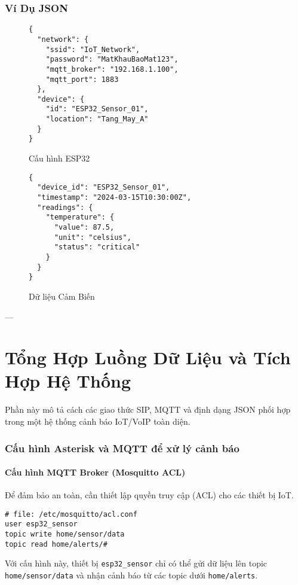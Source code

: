 \subsubsection{Ví Dụ JSON}
\label{subsubsec:json_examples}

\begin{figure}[H]
\centering
\begin{verbatim}
{
  "network": {
    "ssid": "IoT_Network",
    "password": "MatKhauBaoMat123",
    "mqtt_broker": "192.168.1.100",
    "mqtt_port": 1883
  },
  "device": {
    "id": "ESP32_Sensor_01",
    "location": "Tang_May_A"
  }
}
\end{verbatim}
\caption{Cấu hình ESP32}
\label{fig:json_esp32_config}
\end{figure}

\begin{figure}[H]
\centering
\begin{verbatim}
{
  "device_id": "ESP32_Sensor_01",
  "timestamp": "2024-03-15T10:30:00Z",
  "readings": {
    "temperature": {
      "value": 87.5,
      "unit": "celsius",
      "status": "critical"
    }
  }
}
\end{verbatim}
\caption{Dữ liệu Cảm Biến}
\label{fig:json_sensor_data}
\end{figure}

---

\section{Tổng Hợp Luồng Dữ Liệu và Tích Hợp Hệ Thống}
\label{sec:system_integration}

Phần này mô tả cách các giao thức SIP, MQTT và định dạng JSON phối hợp trong một hệ thống cảnh báo IoT/VoIP toàn diện.

\subsubsection{Cấu hình Asterisk và MQTT để xử lý cảnh báo}
\label{subsubsec:config_asterisk}

\paragraph{Cấu hình MQTT Broker (Mosquitto ACL)}
Để đảm bảo an toàn, cần thiết lập quyền truy cập (ACL) cho các thiết bị IoT.
\begin{verbatim}
# file: /etc/mosquitto/acl.conf
user esp32_sensor
topic write home/sensor/data
topic read home/alerts/#
\end{verbatim}
Với cấu hình này, thiết bị \texttt{esp32\_sensor} chỉ có thể gửi dữ liệu lên topic \texttt{home/sensor/data} và nhận cảnh báo từ các topic dưới \texttt{home/alerts}.

